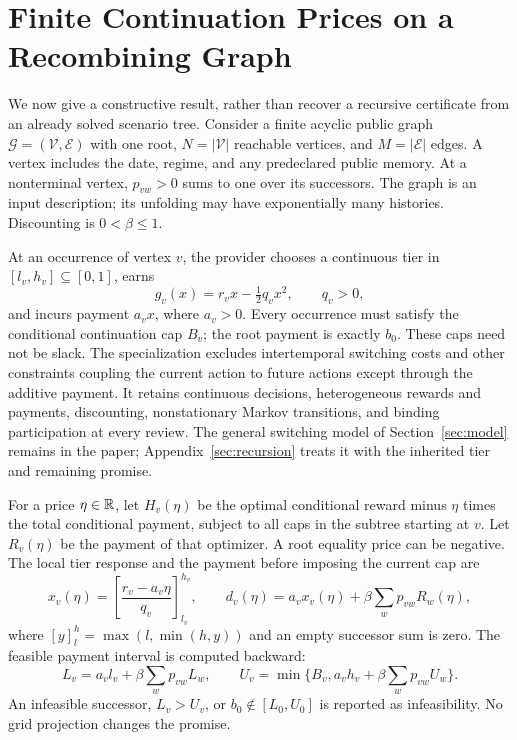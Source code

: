 \section{Finite Continuation Prices on a Recombining Graph}\label{sec:price}
We now give a constructive result, rather than recover a recursive certificate from an already solved scenario tree. Consider a finite acyclic public graph $\mathcal G=(\mathcal V,\mathcal E)$ with one root, $N=|\mathcal V|$ reachable vertices, and $M=|\mathcal E|$ edges. A vertex includes the date, regime, and any predeclared public memory. At a nonterminal vertex, $p_{vw}>0$ sums to one over its successors. The graph is an input description; its unfolding may have exponentially many histories. Discounting is $0<\beta\leq1$.

At an occurrence of vertex $v$, the provider chooses a continuous tier in $[l_v,h_v]\subseteq[0,1]$, earns
\begin{equation}\label{eq:price-local}
 g_v(x)=r_vx-\tfrac12 q_vx^2,\qquad q_v>0,
\end{equation}
and incurs payment $a_vx$, where $a_v>0$. Every occurrence must satisfy the conditional continuation cap $B_v$; the root payment is exactly $b_0$. These caps need not be slack. The specialization excludes intertemporal switching costs and other constraints coupling the current action to future actions except through the additive payment. It retains continuous decisions, heterogeneous rewards and payments, discounting, nonstationary Markov transitions, and binding participation at every review. The general switching model of Section~\ref{sec:model} remains in the paper; Appendix~\ref{sec:recursion} treats it with the inherited tier and remaining promise.

For a price $\eta\in\mathbb R$, let $H_v(\eta)$ be the optimal conditional reward minus $\eta$ times the total conditional payment, subject to all caps in the subtree starting at $v$. Let $R_v(\eta)$ be the payment of that optimizer. A root equality price can be negative. The local tier response and the payment before imposing the current cap are
\begin{equation}\label{eq:raw-response}
 x_v(\eta)=\left[\frac{r_v-a_v\eta}{q_v}\right]_{l_v}^{h_v},\qquad
 d_v(\eta)=a_vx_v(\eta)+\beta\sum_{w}p_{vw}R_w(\eta),
\end{equation}
where $[y]_l^h=\max(l,\min(h,y))$ and an empty successor sum is zero. The feasible payment interval is computed backward:
\begin{equation}\label{eq:price-domain}
 L_v=a_vl_v+\beta\sum_wp_{vw}L_w,\qquad
 U_v=\min\{B_v,a_vh_v+\beta\sum_wp_{vw}U_w\}.
\end{equation}
An infeasible successor, $L_v>U_v$, or $b_0\notin[L_0,U_0]$ is reported as infeasibility. No grid projection changes the promise.

